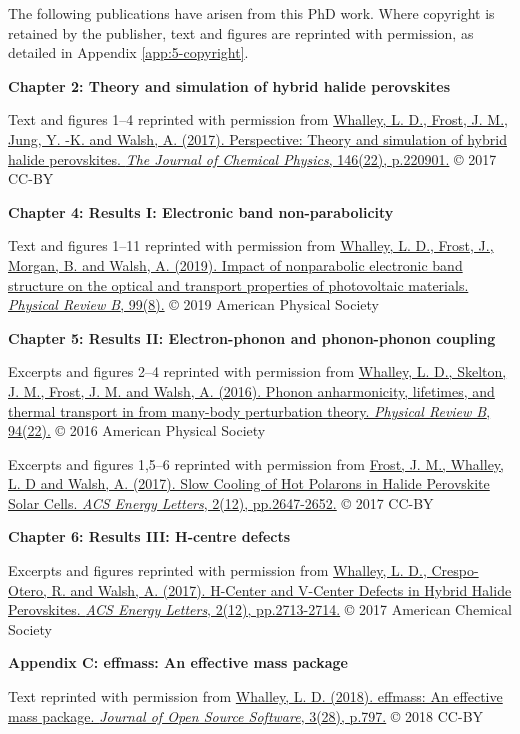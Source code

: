 
The following publications have arisen from this PhD work. Where copyright is retained by the publisher, text and figures are reprinted with permission, as detailed in Appendix \ref{app:5-copyright}.

\vspace{\frontmatterbaselineskip}

\textbf{Chapter 2: Theory and simulation of hybrid halide perovskites } 

Text and figures 1--4 reprinted with permission from
\href{https://doi.org/10.1063/1.4984964}{Whalley, L. D., Frost, J. M., Jung, Y. -K. and Walsh, A. (2017). Perspective: Theory and simulation of hybrid halide perovskites. \textit{The Journal of Chemical Physics}, 146(22), p.220901.} © 2017 CC-BY
\vspace{\frontmatterbaselineskip}

\textbf{Chapter 4: Results I: Electronic band non-parabolicity}

Text and figures 1--11 reprinted with permission from
\href{https://doi.org/10.1103/PhysRevB.99.085207}{Whalley, L. D., Frost, J., Morgan, B. and Walsh, A. (2019). Impact of nonparabolic electronic band structure on the optical and transport properties of photovoltaic materials. \textit{Physical Review B}, 99(8).} © 2019 American Physical Society
\vspace{\frontmatterbaselineskip}

\textbf{Chapter 5: Results II: Electron-phonon and phonon-phonon coupling}

Excerpts and figures 2--4 reprinted with permission from
\href{https://doi.org/10.1103/PhysRevB.94.220301}{Whalley, L. D., Skelton, J. M., Frost, J. M. and Walsh, A. (2016). Phonon anharmonicity, lifetimes, and thermal transport in  from many-body perturbation theory. \textit{Physical Review B}, 94(22).} © 2016 American Physical Society

Excerpts and figures 1,5--6 reprinted with permission from
\href{https://doi.org/10.1021/acsenergylett.7b00862}{Frost, J. M., Whalley, L. D and Walsh, A. (2017). Slow Cooling of Hot Polarons in Halide Perovskite Solar Cells. \textit{ACS Energy Letters}, 2(12), pp.2647-2652.} © 2017 CC-BY
\vspace{\frontmatterbaselineskip}

\textbf{Chapter 6: Results III: H-centre defects}

Excerpts and figures reprinted with permission from
\href{https://doi.org/10.1021/acsenergylett.7b00995}{Whalley, L. D., Crespo-Otero, R. and Walsh, A. (2017). H-Center and V-Center Defects in Hybrid Halide Perovskites. \textit{ACS Energy Letters}, 2(12), pp.2713-2714.} © 2017 American Chemical Society 
\vspace{\frontmatterbaselineskip}

\textbf{Appendix C: effmass: An effective mass package}

Text reprinted with permission from
\href{https://doi.org/10.21105/joss.00797}{Whalley, L. D. (2018). effmass: An effective mass package. \textit{Journal of Open Source Software}, 3(28), p.797.} © 2018 CC-BY 


